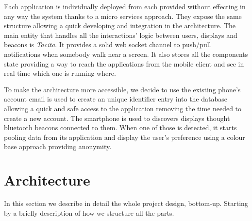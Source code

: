 \documentclass[]{usiinfbachelorproject}
\begin{document}
Each application is individually deployed from each provided without effecting in any way the system thanks to a micro services approach. They expose the same structure allowing a quick developing and integration in the architecture. The main entity that handles all the interactions' logic between users, displays and beacons is \emph{Tacita}. It provides a solid web socket channel to push/pull notifications when somebody walk near a screen. It also stores all the components state providing a way to reach the applications from the mobile client and see in real time which one is running where.

To make the architecture more accessible, we decide to use the existing phone's account email is used to create an unique identifier entry into the database allowing a quick and safe access to the application removing the time needed to create a new account. The smartphone is used to discovers displays thought bluetooth beacons connected to them. When one of those is detected, it starts pooling data from its application and display the user's preference using a colour base approach providing anonymity. 

\section{Architecture}
In this section we describe in detail the whole project design, bottom-up. Starting by a briefly description of how we structure all the parts.
\end{document}
